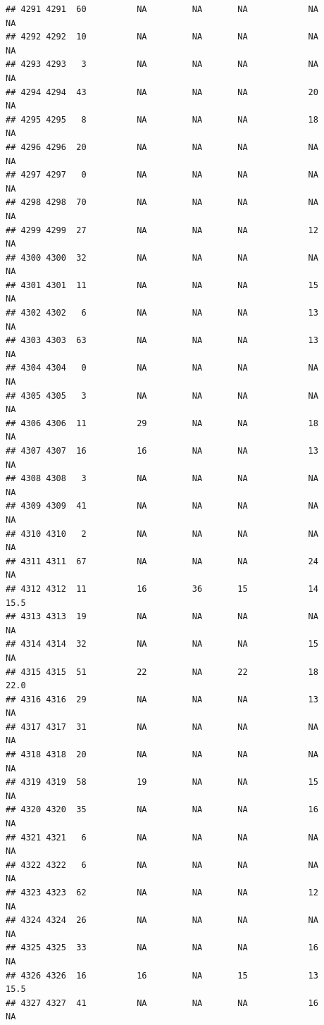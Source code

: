 \documentclass[man]{apa6}
\begin{document}
\begin{verbatim}
## 4291 4291  60          NA         NA       NA            NA       NA
## 4292 4292  10          NA         NA       NA            NA       NA
## 4293 4293   3          NA         NA       NA            NA       NA
## 4294 4294  43          NA         NA       NA            20       NA
## 4295 4295   8          NA         NA       NA            18       NA
## 4296 4296  20          NA         NA       NA            NA       NA
## 4297 4297   0          NA         NA       NA            NA       NA
## 4298 4298  70          NA         NA       NA            NA       NA
## 4299 4299  27          NA         NA       NA            12       NA
## 4300 4300  32          NA         NA       NA            NA       NA
## 4301 4301  11          NA         NA       NA            15       NA
## 4302 4302   6          NA         NA       NA            13       NA
## 4303 4303  63          NA         NA       NA            13       NA
## 4304 4304   0          NA         NA       NA            NA       NA
## 4305 4305   3          NA         NA       NA            NA       NA
## 4306 4306  11          29         NA       NA            18       NA
## 4307 4307  16          16         NA       NA            13       NA
## 4308 4308   3          NA         NA       NA            NA       NA
## 4309 4309  41          NA         NA       NA            NA       NA
## 4310 4310   2          NA         NA       NA            NA       NA
## 4311 4311  67          NA         NA       NA            24       NA
## 4312 4312  11          16         36       15            14     15.5
## 4313 4313  19          NA         NA       NA            NA       NA
## 4314 4314  32          NA         NA       NA            15       NA
## 4315 4315  51          22         NA       22            18     22.0
## 4316 4316  29          NA         NA       NA            13       NA
## 4317 4317  31          NA         NA       NA            NA       NA
## 4318 4318  20          NA         NA       NA            NA       NA
## 4319 4319  58          19         NA       NA            15       NA
## 4320 4320  35          NA         NA       NA            16       NA
## 4321 4321   6          NA         NA       NA            NA       NA
## 4322 4322   6          NA         NA       NA            NA       NA
## 4323 4323  62          NA         NA       NA            12       NA
## 4324 4324  26          NA         NA       NA            NA       NA
## 4325 4325  33          NA         NA       NA            16       NA
## 4326 4326  16          16         NA       15            13     15.5
## 4327 4327  41          NA         NA       NA            16       NA

\end{verbatim}
\end{document}

